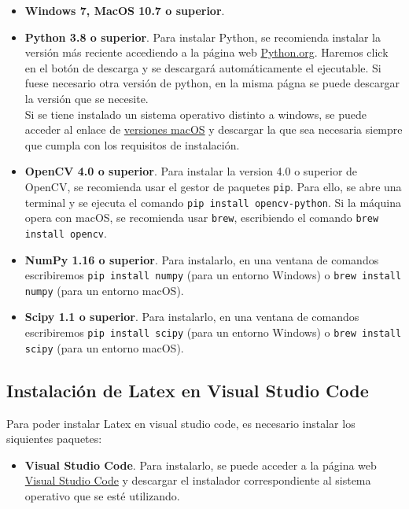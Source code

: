 \documentclass[a4paper]{article}
\begin{document}
\begin{itemize}
    \item \textbf{Windows 7, MacOS 10.7 o superior}.
    \item \textbf{Python 3.8 o superior}. Para instalar Python, se recomienda instalar la versión más reciente accediendo a la página web \href{https://www.python.org/downloads/}{Python.org}. Haremos click en el botón de descarga y se descargará automáticamente el ejecutable. Si fuese necesario otra versión de python, en la misma págna se puede descargar la versión que se necesite.\\
    Si se tiene instalado un sistema operativo distinto a windows, se puede acceder al enlace de \href{https://www.python.org/downloads/macos/}{versiones macOS} y descargar la que sea necesaria siempre que cumpla con los requisitos de instalación.
    \item \textbf{OpenCV 4.0 o superior}. Para instalar la version 4.0 o superior de OpenCV, se recomienda usar el gestor de paquetes \texttt{pip}. Para ello, se abre una terminal y se ejecuta el comando \texttt{pip install opencv-python}. Si la máquina opera con macOS, se recomienda usar \texttt{brew}, escribiendo el comando \texttt{brew install opencv}.
    \item \textbf{NumPy 1.16 o superior}. Para instalarlo, en una ventana de comandos escribiremos \texttt{pip install numpy} (para un entorno Windows) o \texttt{brew install numpy} (para un entorno macOS).
    \item \textbf{Scipy 1.1 o superior}. Para instalarlo, en una ventana de comandos escribiremos \texttt{pip install scipy} (para un entorno Windows) o \texttt{brew install scipy} (para un entorno macOS).

\end{itemize}

\subsection{Instalación de Latex en Visual Studio Code}

Para poder instalar Latex en visual studio code, es necesario instalar los siquientes paquetes:

\begin{itemize}
    \item \textbf{Visual Studio Code}. Para instalarlo, se puede acceder a la página web \href{https://code.visualstudio.com/}{Visual Studio Code} y descargar el instalador correspondiente al sistema operativo que se esté utilizando.
\end{itemize}
\end{document}
